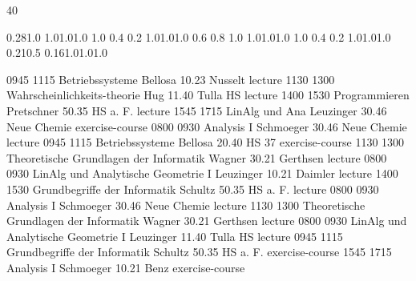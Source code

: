 \documentclass[a4paper,12pt]{report}
\begin{document}
\thispagestyle{empty}
\begin{landscape}
\noindent{}

\setslotsize{2.8cm}{0.3cm}
 {40}
\settextframe{0.8mm}

\seteventcornerradius{0pt}


 {0.28}{1.0} {1.0}{1.0}{1.0}
    {1.0} {0.4} {0.2} {1.0}{1.0}{1.0}
   {0.6} {0.8} {1.0} {1.0}{1.0}{1.0}
 {1.0} {0.4} {0.2} {1.0}{1.0}{1.0}
       {0.21}{0.5} {0.16}{1.0}{1.0}{1.0}

\begin{timetable}
   {0945} {1115} {Betriebssysteme}                        {Bellosa}          {10.23 Nusselt}     {lecture}
   {1130} {1300} {Wahrscheinlichkeits-theorie}            {Hug}              {11.40 Tulla HS}    {lecture}
   {1400} {1530} {Programmieren}                          {Pretschner}       {50.35 HS a. F.}    {lecture}
   {1545} {1715} {LinAlg und Ana}                         {Leuzinger}        {30.46 Neue Chemie} {exercise-course}
   {0800} {0930} {Analysis I}                             {Schmoeger}        {30.46 Neue Chemie} {lecture}
   {0945} {1115} {Betriebssysteme}                        {Bellosa}          {20.40 HS 37}       {exercise-course}
   {1130} {1300} {Theoretische Grundlagen der Informatik} {Wagner}           {30.21 Gerthsen}    {lecture}
   {0800} {0930} {LinAlg und Analytische Geometrie I}     {Leuzinger}        {10.21 Daimler}     {lecture}
   {1400} {1530} {Grundbegriffe der Informatik}           {Schultz}          {50.35 HS a. F.}    {lecture}
   {0800} {0930} {Analysis I}                             {Schmoeger}        {30.46 Neue Chemie} {lecture}
   {1130} {1300} {Theoretische Grundlagen der Informatik} {Wagner}           {30.21 Gerthsen}    {lecture}
   {0800} {0930} {LinAlg und Analytische Geometrie I}     {Leuzinger}        {11.40 Tulla HS}    {lecture}
   {0945} {1115} {Grundbegriffe der Informatik}           {Schultz}          {50.35 HS a. F.}    {exercise-course}
   {1545} {1715} {Analysis I}                             {Schmoeger}        {10.21 Benz}        {exercise-course}
\end{timetable}
\end{landscape}
\end{document}
